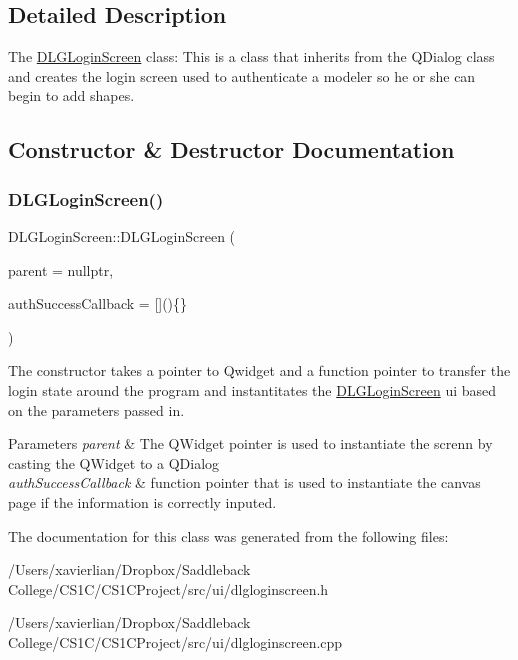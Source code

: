 \subsection{Detailed Description}
The \mbox{\hyperlink{class_d_l_g_login_screen}{D\+L\+G\+Login\+Screen}} class\+: This is a class that inherits from the Q\+Dialog class and creates the login screen used to authenticate a modeler so he or she can begin to add shapes. 

\subsection{Constructor \& Destructor Documentation}
\mbox{\label{class_d_l_g_login_screen_aabc315a7cca94bcccf1965a5dd2d6dd4}} 
\subsubsection{\texorpdfstring{DLGLoginScreen()}{DLGLoginScreen()}}
{\footnotesize\ttfamily D\+L\+G\+Login\+Screen\+::\+D\+L\+G\+Login\+Screen (\begin{DoxyParamCaption}\item[{Q\+Widget $\ast$}]{parent = {\ttfamily nullptr},  }\item[{std\+::function$<$ void()$>$}]{auth\+Success\+Callback = {\ttfamily \mbox{[}\mbox{]}()\{\}} }\end{DoxyParamCaption})\hspace{0.3cm}{\ttfamily [explicit]}}



The constructor takes a pointer to Qwidget and a function pointer to transfer the login state around the program and instantitates the \mbox{\hyperlink{class_d_l_g_login_screen}{D\+L\+G\+Login\+Screen}} ui based on the parameters passed in. 


\begin{DoxyParams}{Parameters}
{\em parent} & The Q\+Widget pointer is used to instantiate the screnn by casting the Q\+Widget to a Q\+Dialog \\
\hline
{\em auth\+Success\+Callback} & function pointer that is used to instantiate the canvas page if the information is correctly inputed. \\
\hline
\end{DoxyParams}


The documentation for this class was generated from the following files\+:\begin{DoxyCompactItemize}
\item 
/\+Users/xavierlian/\+Dropbox/\+Saddleback College/\+C\+S1\+C/\+C\+S1\+C\+Project/src/ui/dlgloginscreen.\+h\item 
/\+Users/xavierlian/\+Dropbox/\+Saddleback College/\+C\+S1\+C/\+C\+S1\+C\+Project/src/ui/dlgloginscreen.\+cpp\end{DoxyCompactItemize}
